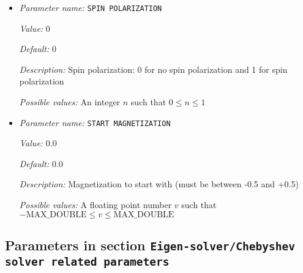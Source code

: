 \begin{itemize}
{\it Possible values:} An integer $n$ such that $1\leq n \leq 2$
\item {\it Parameter name:} {\tt SPIN POLARIZATION}
\label{parameters:DFT functional related parameters/SPIN POLARIZATION}
\label{parameters:DFT_20functional_20related_20parameters/SPIN_20POLARIZATION}


{\it Value:} 0


{\it Default:} 0


{\it Description:} Spin polarization: 0 for no spin polarization and 1 for spin polarization


{\it Possible values:} An integer $n$ such that $0\leq n \leq 1$
\item {\it Parameter name:} {\tt START MAGNETIZATION}
\label{parameters:DFT functional related parameters/START MAGNETIZATION}
\label{parameters:DFT_20functional_20related_20parameters/START_20MAGNETIZATION}


{\it Value:} 0.0


{\it Default:} 0.0


{\it Description:} Magnetization to start with (must be between -0.5 and +0.5)


{\it Possible values:} A floating point number $v$ such that $-\text{MAX\_DOUBLE} \leq v \leq \text{MAX\_DOUBLE}$
\end{itemize}

\subsection{Parameters in section \tt Eigen-solver/Chebyshev solver related parameters}
\label{parameters:Eigen_2dsolver_2fChebyshev_20solver_20related_20parameters}

